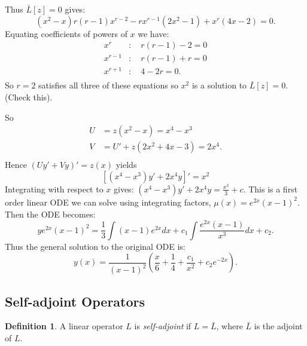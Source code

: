 \documentclass{article}
\theoremstyle{plain}
\theoremstyle{definition}
\newtheorem{definition}[thm]{Definition}
\numberwithin{equation}{section}
\begin{document}
\begin{tcolorbox}
    

        Thus $\bar{L}[z] = 0$ gives:
        \[ (x^2-x)r(r-1)x^{r-2} - rx^{r-1}(2x^2-1)+x^r(4x-2) = 0. \]
        Equating coefficients of powers of $x$ we have:
        \begin{align*}
            x^r&: \quad r(r-1)-2=0 \\
            x^{r-1}&: \quad r(r-1)+r=0 \\
            x^{r+1}&: \quad 4-2r = 0. \\
        \end{align*}
        So $r=2$ satisfies all three of these equations so $x^2$ is a solution to $\bar{L}[z] = 0$. (Check this).

        So
        \begin{align*}
            U &= z(x^2-x) = x^4 - x^3 \\
            V &= U' + z(2x^2+4x-3) = 2x^4. \\
        \end{align*}
        Hence $(Uy' + Vy)' = z(x)$ yields
        \[ \left[ (x^4-x^3)y' + 2x^4y \right]' = x^2 \]
        Integrating with respect to $x$ gives: $(x^4-x^3)y' +2x^4y=\frac{x^3}{3}+c$.
        This is a first order linear ODE we can solve using integrating factors, $\mu(x) = e^{2x}(x-1)^2$. Then the ODE becomes:
        \[ ye^{2x}(x-1)^2 = \frac{1}{3} \int (x-1)e^{2x}dx + c_1 \int \frac{e^{2x}(x-1)}{x^3} dx + c_2. \]
        Thus the general solution to the original ODE is:
        \[ y(x) = \frac{1}{(x-1)^2} \left( \frac{x}{6}+\frac{1}{4}+\frac{c_1}{x^2} + c_2e^{-2x} \right). \]


\end{tcolorbox}

\subsection{Self-adjoint Operators}

\begin{definition}
    A linear operator $L$ is \textit{self-adjoint} if $L=\bar{L}$, where $\bar{L}$ is the adjoint of $L$.
\end{definition}
\end{document}
